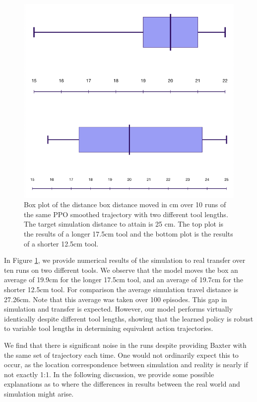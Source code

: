 \documentclass[conference]{IEEEtran}
\begin{document}
\begin{figure}[h!]
\centering
 \includegraphics[scale=0.37]{bothboxes.png}
 \caption{Box plot of the distance box distance moved in cm over 10 runs of the same PPO smoothed trajectory with two different tool lengths. The target simulation distance to attain is 25 cm. The top plot is the results of a longer 17.5cm tool and the bottom plot is the results of a shorter 12.5cm tool.}
 \label{fig:boxplot}
\end{figure} 

In Figure \ref{fig:boxplot}, we provide numerical results of the simulation to real transfer over ten runs on two different tools. We observe that the model moves the box an average of 19.9cm for the longer 17.5cm tool, and an average of 19.7cm for the shorter 12.5cm tool. For comparison the average simulation travel distance is 27.26cm. Note that this average was taken over 100 episodes. This gap in simulation and transfer is expected. However, our model performs virtually identically despite different tool lengths, showing that the learned policy is robust to variable tool lengths in determining equivalent action trajectories.

We find that there is significant noise in the runs despite providing Baxter with the same set of trajectory each time. One would not ordinarily expect this to occur, as the location correspondence between simulation and reality is nearly if not exactly 1:1. In the following discussion, we provide some possible explanations as to where the differences in results between the real world and simulation might arise.  
\end{document}

